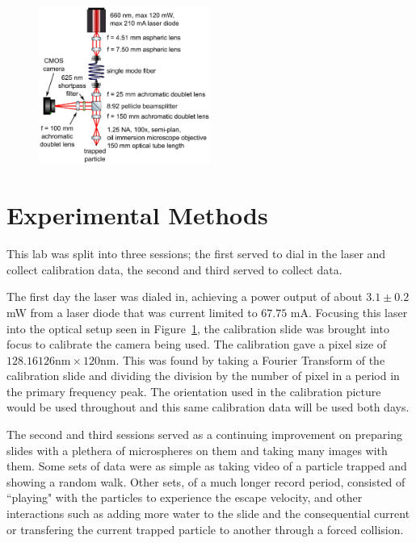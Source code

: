 \documentclass[12pt]{article}
\begin{document}
\begin{figure}
\centering
    \includegraphics[width=0.5\textwidth]{optical_trap.jpg}
	\caption{\cite{handout}}
    \label{fig:opt_trap}
\end{figure} %

\section{Experimental Methods}
This lab was split into three sessions; the first served to dial in the laser and collect calibration data, the second and third served to collect data. 

The first day the laser was dialed in, achieving a power output of about $3.1 \pm 0.2$ mW from a laser diode that was current limited to $67.75$ mA. Focusing this laser into the optical setup seen in Figure~\ref{fig:opt_trap}, the calibration slide was brought into focus to calibrate the camera being used. The calibration gave a pixel size of $128.16126 \text{nm} \times 120 \text{nm}$. This was found by taking a Fourier Transform of the calibration slide and dividing the division by the number of pixel in a period in the primary frequency peak. The orientation used in the calibration picture would be used throughout and this same calibration data will be used both days. 

The second and third sessions served as a continuing improvement on preparing slides with a plethera of microspheres on them and taking many images with them. Some sets of data were as simple as taking video of a particle trapped and showing a random walk. Other sets, of a much longer record period, consisted of ``playing" with the particles to experience the escape velocity, and other interactions such as adding more water to the slide and the consequential current or transfering the current trapped particle to another through a forced collision.
\end{document}
